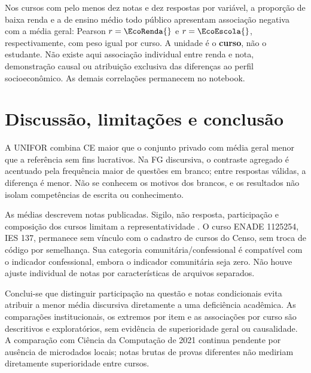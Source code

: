 \documentclass[12pt,a4paper]{article}
\begin{document}
Nos \EcoCursos{} cursos com pelo menos dez notas e dez respostas por variável,
a proporção de baixa renda e a de ensino médio todo público apresentam
associação negativa com a média geral: Pearson $r=\EcoRenda{}$ e
$r=\EcoEscola{}$, respectivamente, com peso igual por curso. A unidade é o
\textbf{curso}, não o estudante. Não existe aqui associação individual entre
renda e nota, demonstração causal ou atribuição exclusiva das diferenças ao
perfil socioeconômico. As demais correlações permanecem no notebook.

\section{Discussão, limitações e conclusão}
A UNIFOR combina CE maior que o conjunto privado com média geral menor que a
referência sem fins lucrativos. Na FG discursiva, o contraste agregado é
acentuado pela frequência maior de questões em branco; entre respostas válidas,
a diferença é menor. Não se conhecem os motivos dos brancos, e os resultados
não isolam competências de escrita ou conhecimento.

As médias descrevem notas publicadas. Sigilo, não resposta, participação e
composição dos cursos limitam a representatividade \cite[pp.~7--8]{manual}.
O curso ENADE 1125254, IES 137, permanece sem vínculo com o cadastro de cursos
do Censo, sem troca de código por semelhança. Sua categoria comunitária/confessional
é compatível com o indicador confessional, embora o indicador comunitária seja zero.
Não houve ajuste individual de notas por características de arquivos separados.

Conclui-se que distinguir participação na questão e notas condicionais evita
atribuir a menor média discursiva diretamente a uma deficiência acadêmica.
As comparações institucionais, os extremos por item e as associações por curso
são descritivos e exploratórios, sem evidência de superioridade geral ou causalidade.
A comparação com Ciência da Computação de 2021 continua pendente por ausência
de microdados locais; notas brutas de provas diferentes não mediriam diretamente
superioridade entre cursos.
\end{document}
